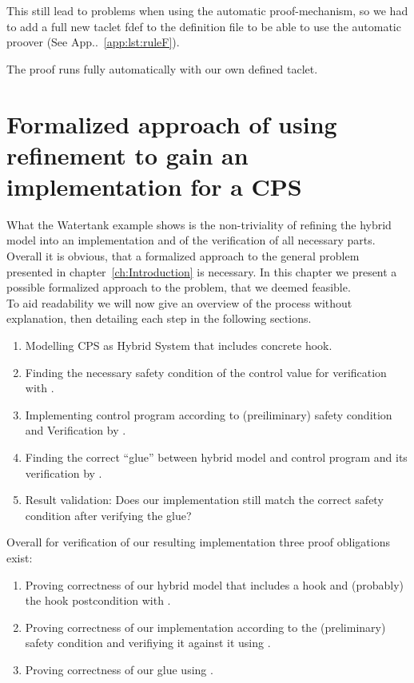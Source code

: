 This still lead to problems when using the automatic proof-mechanism, so we had to add a full new taclet fdef to the definition file to be able to use the automatic proover (See App..~\ref{app:lst:ruleF}).

The proof runs fully automatically with our own defined taclet.

\chapter{Formalized approach of using refinement to gain an implementation for a CPS}
\label{ch:Process}

What the Watertank example shows is the non-triviality of refining the hybrid model into an implementation and of the verification of all necessary parts. Overall it is obvious, that a formalized approach to the general problem presented in chapter~\ref{ch:Introduction} is necessary. In this chapter we present a possible formalized approach to the problem, that we deemed feasible.
\\


To aid readability we will now give an overview of the process without explanation, then detailing each step in the following sections. 

\begin{enumerate}
	\item Modelling CPS as Hybrid System that includes concrete hook.
	\item Finding the necessary safety condition of the control value for verification with \keym.
	\item Implementing control program according to (preiliminary) safety condition and Verification by \key.		
	\item Finding the correct ``glue'' between hybrid model and control program and its verification by \keym.
	\item Result validation: Does our implementation still match the correct safety condition after verifying the glue?
\end{enumerate}

Overall for verification of our resulting implementation three proof obligations exist:
\begin{enumerate}[label=\roman*]
	\item Proving correctness of our hybrid model that includes a hook and (probably) the hook postcondition with \keym.
	\item Proving correctness of our implementation according to the (preliminary) safety condition and verifiying it against it using \key.
	\item Proving correctness of our glue using \keym.
\end{enumerate} 

